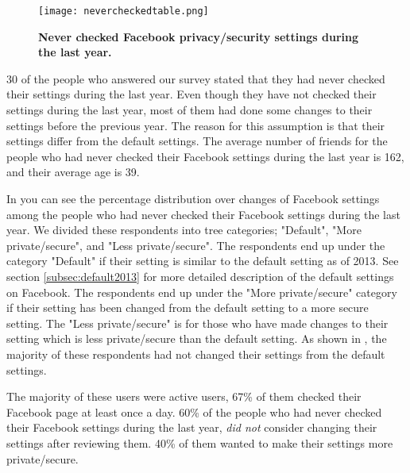 \begin{figure}[b]
\centering
\texttt{[image: nevercheckedtable.png]}
\caption[Never checked Facebook privacy/security settings during the last year]{\textbf{Never checked Facebook privacy/security settings during the last year.}} 
\label{fig:neverchecked}
\end{figure}

30 of the people who answered our survey stated that they had never checked their settings during the last year. Even though they have not checked their  settings during the last year, most of them had done some changes to their settings before the previous year. The reason for this assumption is that their settings differ from the default settings.  
The average number of friends for the people who had never checked their Facebook settings during the last year is 162, and their average age is 39. 

In  you can see the percentage distribution over changes of Facebook settings among the people who had never checked their Facebook settings during the last year. We divided these respondents into tree categories; "Default", "More private/secure", and "Less private/secure". The respondents end up under the category "Default" if their setting is similar to the default setting as of 2013. See section \ref{subsec:default2013} for more detailed description of the default settings on Facebook. The respondents end up under the "More private/secure" category if their setting has been changed from the default setting to a more secure setting. The "Less private/secure" is for those who have made changes to their setting which is less private/secure than the default setting. As shown in , the majority of these respondents had not changed their settings from the default settings. 

The majority of these users were active users, 67\% of them checked their Facebook page at least once a day. 60\% of the people who had never checked their Facebook settings during the last year, \textit{did not} consider changing their settings after reviewing them. 40\% of them wanted to make their settings more private/secure. 



